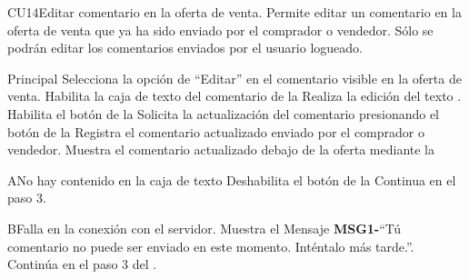 \begin{UseCase}{CU14}{Editar comentario en la oferta de venta.}{
		Permite editar un comentario en la oferta de venta que ya ha sido enviado por el comprador o vendedor. Sólo se podrán editar los comentarios enviados por el usuario logueado.
	}
		
	\end{UseCase}

	\begin{UCtrayectoria}{Principal}
		\UCpaso[\UCactor] Selecciona la opción de ``Editar'' en el comentario visible en la oferta de venta.
		\UCpaso Habilita la caja de texto del comentario  de la 
		\UCpaso[\UCactor] Realiza la edición del texto .
		\UCpaso Habilita el botón  de la 
		\UCpaso[\UCactor] Solicita la actualización del comentario presionando el botón  de la 
		\UCpaso Registra el comentario actualizado enviado por el comprador o vendedor.
		\UCpaso Muestra el comentario actualizado debajo de la oferta mediante la 
\end{UCtrayectoria}
		\begin{UCtrayectoriaA}{A}{No hay contenido en la caja de texto}
			\UCpaso Deshabilita el botón  de la 
			\UCpaso Continua en el paso 3.
		\end{UCtrayectoriaA}
		
		\begin{UCtrayectoriaA}{B}{Falla en la conexión con el servidor.}
			\UCpaso Muestra el Mensaje {\bf MSG1-}``Tú comentario no puede ser enviado en este momento. Inténtalo más tarde.''.
			\UCpaso Continúa en el paso 3 del .
		\end{UCtrayectoriaA}
		
		
		
